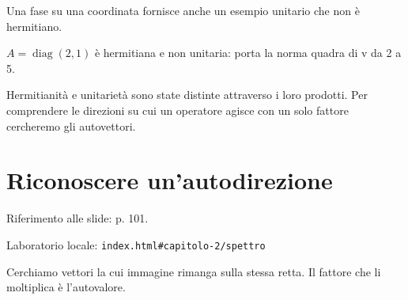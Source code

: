 \label{c2-aggiunto-example-2-step-4}


Una fase su una coordinata fornisce anche un esempio unitario che non è hermitiano.\par



\(A=\operatorname{diag}(2{,}1)\) è hermitiana e non unitaria: porta la norma quadra di v da 2 a 5.\par


Hermitianità e unitarietà sono state distinte attraverso i loro prodotti. Per comprendere le direzioni su cui un operatore agisce con un solo fattore cercheremo gli autovettori.\par



\Needspace{.43\textheight}
\section{Riconoscere un'autodirezione}
\label{c2-spettro}

{\sffamily\small\color{Ink!70} Riferimento alle slide: p. 101.\par}

{\sffamily\small\color{Ink!70} Laboratorio locale: \nolinkurl{index.html#capitolo-2/spettro}\par}

Cerchiamo vettori la cui immagine rimanga sulla stessa retta. Il fattore che li moltiplica è l'autovalore.\par

